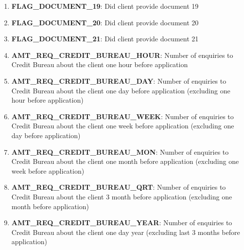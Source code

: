 \documentclass[12pt, letterpaper]{article}
\begin{document}
\begin{appendices}
\begin{enumerate}
  \item \textbf{FLAG_DOCUMENT_19}: Did client provide document 19
  \item \textbf{FLAG_DOCUMENT_20}: Did client provide document 20
  \item \textbf{FLAG_DOCUMENT_21}: Did client provide document 21
  \item \textbf{AMT_REQ_CREDIT_BUREAU_HOUR}: Number of enquiries to Credit Bureau about the client one hour before application
  \item \textbf{AMT_REQ_CREDIT_BUREAU_DAY}: Number of enquiries to Credit Bureau about the client one day before application (excluding one hour before application)
  \item \textbf{AMT_REQ_CREDIT_BUREAU_WEEK}: Number of enquiries to Credit Bureau about the client one week before application (excluding one day before application)
  \item \textbf{AMT_REQ_CREDIT_BUREAU_MON}: Number of enquiries to Credit Bureau about the client one month before application (excluding one week before application)
  \item \textbf{AMT_REQ_CREDIT_BUREAU_QRT}: Number of enquiries to Credit Bureau about the client 3 month before application (excluding one month before application)
  \item \textbf{AMT_REQ_CREDIT_BUREAU_YEAR}: Number of enquiries to Credit Bureau about the client one day year (excluding last 3 months before application)
\end{enumerate}


\end{appendices}
\end{document}
